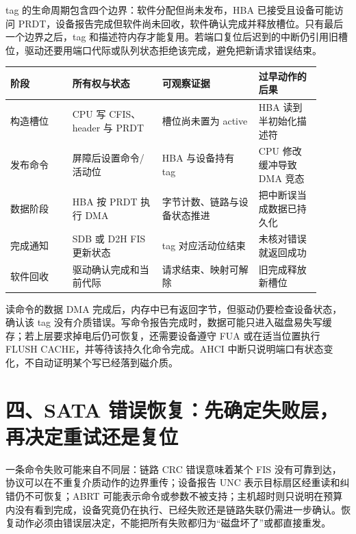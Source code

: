 tag 的生命周期包含四个边界：软件分配但尚未发布，HBA 已接受且设备可能访问 PRDT，设备报告完成但软件尚未回收，软件确认完成并释放槽位。只有最后一个边界之后，tag 和描述符内存才能复用。若端口复位后迟到的中断仍引用旧槽位，驱动还要用端口代际或队列状态拒绝该完成，避免把新请求错误结束。

\begin{longtable}{L{0.18\linewidth}L{0.26\linewidth}L{0.28\linewidth}L{0.18\linewidth}}
\toprule
阶段 & 所有权与状态 & 可观察证据 & 过早动作的后果 \\
\midrule
构造槽位 & CPU 写 CFIS、header 与 PRDT & 槽位尚未置为 active & HBA 读到半初始化描述符 \\\tablerowrule
发布命令 & 屏障后设置命令/活动位 & HBA 与设备持有 tag & CPU 修改缓冲导致 DMA 竞态 \\\tablerowrule
数据阶段 & HBA 按 PRDT 执行 DMA & 字节计数、链路与设备状态推进 & 把中断误当成数据已持久化 \\\tablerowrule
完成通知 & SDB 或 D2H FIS 更新状态 & tag 对应活动位结束 & 未核对错误就返回成功 \\\tablerowrule
软件回收 & 驱动确认完成和当前代际 & 请求结束、映射可解除 & 旧完成释放新槽位 \\
\bottomrule
\end{longtable}


读命令的数据 DMA 完成后，内存中已有返回字节，但驱动仍要检查设备状态，确认该 tag 没有介质错误。写命令报告完成时，数据可能只进入磁盘易失写缓存；若上层要求掉电后仍可恢复，还需要设备遵守 FUA 或在适当位置执行 FLUSH CACHE，并等待该持久化命令完成。AHCI 中断只说明端口有状态变化，不自动证明某个写已经落到磁介质。

\section{四、SATA 错误恢复：先确定失败层，再决定重试还是复位}

一条命令失败可能来自不同层：链路 CRC 错误意味着某个 FIS 没有可靠到达，协议可以在不重复介质动作的边界重传；设备报告 UNC 表示目标扇区经重读和纠错仍不可恢复；ABRT 可能表示命令或参数不被支持；主机超时则只说明在预算内没有看到完成，设备究竟仍在执行、已经失败还是链路失联仍需进一步确认。恢复动作必须由错误层决定，不能把所有失败都归为“磁盘坏了”或都直接重发。

